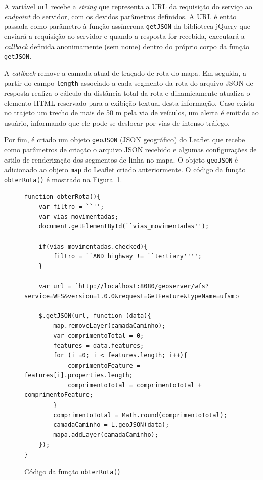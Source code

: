 \documentclass[oneside,openright,12pt]{ufsm_2015} %
\begin{document}
A variável {\tt url} recebe a \textit{string} que representa a URL da requisição do serviço ao \textit{endpoint} do servidor, com os devidos parâmetros definidos. 
A URL é então passada como parâmetro à função assíncrona {\tt getJSON} da biblioteca jQuery que enviará a requisição ao servidor e quando a resposta for recebida, executará a \textit{callback} definida anonimamente (sem nome) dentro do próprio corpo da função {\tt getJSON}.

A \textit{callback} remove a camada atual de traçado de rota do mapa. Em seguida, a partir do campo {\tt length} associado a cada segmento da rota do arquivo JSON de resposta realiza o cálculo da distância total da rota e dinamicamente atualiza o elemento HTML reservado para a exibição textual desta informação. Caso exista no trajeto um trecho de mais de 50 m pela via de veículos, um alerta é emitido ao usuário, informando que ele pode se deslocar por vias de intenso tráfego.

Por fim, é criado um objeto {\tt geoJSON} (JSON geográfico) do Leaflet que recebe como parâmetros de criação o arquivo JSON recebido e algumas configurações de estilo de renderização dos segmentos de linha no mapa. O objeto {\tt geoJSON}  é adicionado ao objeto {\tt map} do Leaflet criado anteriormente. O código da função {\tt obterRota()} é mostrado na Figura~\ref{codigo:obterRota}.

\begin{figure}[h!]
    \centering

    \caption{Código da função {\tt obterRota()}}
    \label{codigo:obterRota}
    \begin{lstlisting}[]
function obterRota(){
    var filtro = ``'';
    var vias_movimentadas;
    document.getElementById(``vias_movimentadas'');

    if(vias_movimentadas.checked){
        filtro = ``AND highway != ``tertiary'''';
    }

    var url = `http://localhost:8080/geoserver/wfs?service=WFS&version=1.0.0&request=GetFeature&typeName=ufsm:calcula_rota&outputformat=application/json&viewparams=source:${source};target:${target};filtro:${filtro};';

    $.getJSON(url, function (data){
        map.removeLayer(camadaCaminho);
        var comprimentoTotal = 0;
        features = data.features;
        for (i =0; i < features.length; i++){
            comprimentoFeature = features[i].properties.length;
            comprimentoTotal = comprimentoTotal + comprimentoFeature;
        }
        comprimentoTotal = Math.round(comprimentoTotal);
        camadaCaminho = L.geoJSON(data);
        mapa.addLayer(camadaCaminho);
    });
}
\end{lstlisting}
\end{figure}
\end{document}
